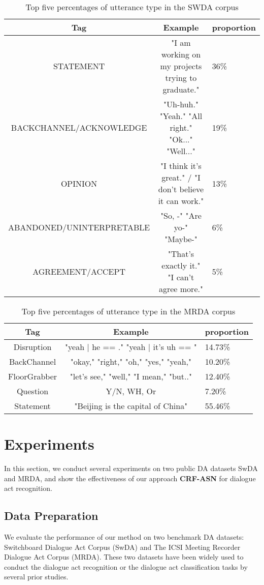 \documentclass[sigconf]{acmart}
\begin{document}
\begin{table*}
	\begin{tabular}{ccl}
		\toprule
		Tag    &Example &proportion       \\
		\midrule
		STATEMENT &"I am working on my projects trying to graduate." &36\% \\
		BACKCHANNEL/ACKNOWLEDGE &"Uh-huh."   "Yeah."  "All right." "Ok..."  "Well..." &19\% \\
		OPINION &"I think it's great." / "I don't believe it can work."&13\% \\
		ABANDONED/UNINTERPRETABLE &"So, -"  "Are yo-"  "Maybe-"&6\% \\
		AGREEMENT/ACCEPT &"That's exactly it." "I can't agree more."&5\% \\
		\bottomrule
	\end{tabular}
	\caption{Top five percentages of utterance type in the SWDA corpus}
\end{table*}
\begin{table}
	\begin{tabular}{ccl}
		\toprule
		Tag    &Example &proportion \\
		\midrule
		Disruption &"yeah | he == ." "yeah | it's uh == " &14.73\% \\
		BackChannel & "okay," "right," "oh," "yes,"
		"yeah,"  &10.20\% \\
		FloorGrabber &"let's see,"
		"well," "I mean," "but.."   &12.40\% \\
		Question &Y/N, WH, Or &7.20\% \\
		Statement&"Beijing is the capital of China" &55.46\% \\
		\bottomrule
	\end{tabular}
	\caption{Top five percentages of utterance type in the MRDA corpus}
\end{table}

\section{Experiments}
In this section, we conduct several experiments on two public DA datasets SwDA and MRDA, and show the effectiveness of our approach \textbf{CRF-ASN} for dialogue act recognition.

\subsection{Data Preparation}
We evaluate the performance of our method on two benchmark DA datasets: Switchboard Dialogue Act Corpus (SwDA) and The ICSI Meeting Recorder Dialogue Act Corpus (MRDA). These two datasets have been widely used to conduct the dialogue act recognition or the dialogue act classification tasks by several prior studies. 
\end{document}
